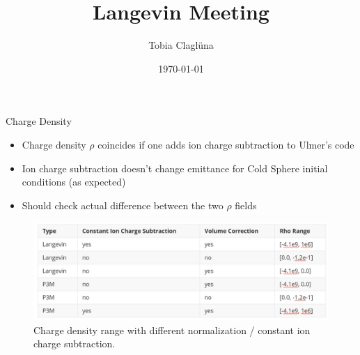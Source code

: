 
\title[\today]{Langevin Meeting}

\author{Tobia Claglüna}
\date{\today}
\def \myEmail {tobia.clagluena@psi.ch}




\begin{frame}{Charge Density}
    \begin{itemize}
        \item Charge density $\rho$ coincides if one adds ion charge subtraction to Ulmer's code
        \item Ion charge subtraction doesn't change emittance for Cold Sphere initial conditions (as expected)
        \item Should check actual difference between the two $\rho$ fields
    \end{itemize}
    \begin{figure}[!htb]
        \centering
        \captionsetup{justification=centering}
      \includegraphics[width=1.0\linewidth]{figures/rho_comparison.png}
        \caption{Charge density range with different normalization / constant ion charge subtraction.}
      \label{fig:rho_comparison}
    \end{figure}
\end{frame}

